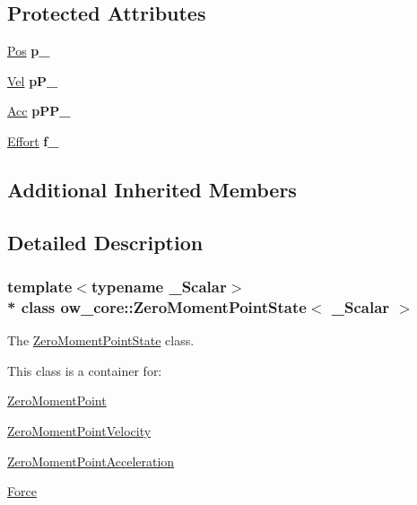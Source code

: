 \subsection*{Protected Attributes}
\begin{DoxyCompactItemize}
\item 
\hyperlink{classow__core_1_1ZeroMomentPoint}{Pos} {\bfseries p\+\_\+}\hypertarget{classow__core_1_1ZeroMomentPointState_a1c92ff1a65891f334cbf2be60821f638}{}\label{classow__core_1_1ZeroMomentPointState_a1c92ff1a65891f334cbf2be60821f638}

\item 
\hyperlink{classow__core_1_1ZeroMomentPointVelocity}{Vel} {\bfseries p\+P\+\_\+}\hypertarget{classow__core_1_1ZeroMomentPointState_ac24f793216499c6c627fce709bcb779a}{}\label{classow__core_1_1ZeroMomentPointState_ac24f793216499c6c627fce709bcb779a}

\item 
\hyperlink{classow__core_1_1ZeroMomentPointAcceleration}{Acc} {\bfseries p\+P\+P\+\_\+}\hypertarget{classow__core_1_1ZeroMomentPointState_ad5d00f02bf295e675fea858ebe46fb27}{}\label{classow__core_1_1ZeroMomentPointState_ad5d00f02bf295e675fea858ebe46fb27}

\item 
\hyperlink{classow__core_1_1Force}{Effort} {\bfseries f\+\_\+}\hypertarget{classow__core_1_1ZeroMomentPointState_acbc2b35570ffe9526ba28e8c55b1cfb1}{}\label{classow__core_1_1ZeroMomentPointState_acbc2b35570ffe9526ba28e8c55b1cfb1}

\end{DoxyCompactItemize}
\subsection*{Additional Inherited Members}


\subsection{Detailed Description}
\subsubsection*{template$<$typename \+\_\+\+Scalar$>$\\*
class ow\+\_\+core\+::\+Zero\+Moment\+Point\+State$<$ \+\_\+\+Scalar $>$}

The \hyperlink{classow__core_1_1ZeroMomentPointState}{Zero\+Moment\+Point\+State} class. 

This class is a container for\+:
\begin{DoxyItemize}
\item \hyperlink{classow__core_1_1ZeroMomentPoint}{Zero\+Moment\+Point}
\item \hyperlink{classow__core_1_1ZeroMomentPointVelocity}{Zero\+Moment\+Point\+Velocity}
\item \hyperlink{classow__core_1_1ZeroMomentPointAcceleration}{Zero\+Moment\+Point\+Acceleration}
\item \hyperlink{classow__core_1_1Force}{Force} 
\end{DoxyItemize}

